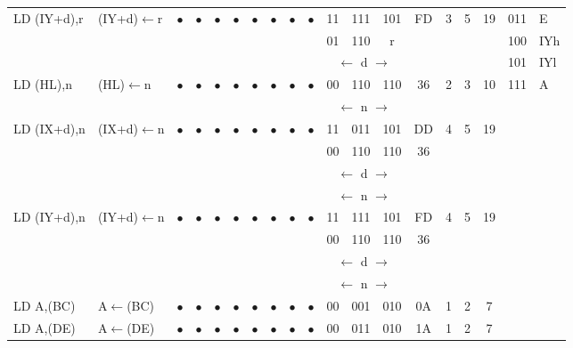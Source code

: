\documentclass[oneside,a4paper]{book}
\begin{document}
{\begin{tabular}{llc@{ }c@{ }c@{ }c@{ }c@{ }c@{ }c@{ }cc@{ }c@{ }cccccll}
LD (IY+d),r & (IY+d)$\leftarrow$r & 
	$\bullet$ & $\bullet$ & $\bullet$ & $\bullet$ & $\bullet$ & $\bullet$ & $\bullet$ & $\bullet$ & 11 & 111 & 101
	& FD & 3 & 5 & 19 & 011 & E \\
\multicolumn{10}{c}{} & 01 & 110 & r & \multicolumn{4}{c}{} & 100 & IYh \\
\multicolumn{10}{c}{} & \multicolumn{3}{c}{$\leftarrow$ d $\rightarrow$} & \multicolumn{4}{c}{} & 101 & IYl \\

LD (HL),n & (HL)$\leftarrow$n & 
	$\bullet$ & $\bullet$ & $\bullet$ & $\bullet$ & $\bullet$ & $\bullet$ & $\bullet$ & $\bullet$ & 00 & 110 & 110
	& 36 & 2 & 3 & 10 & 111 & A \\
\multicolumn{10}{c}{} & \multicolumn{3}{c}{$\leftarrow$ n $\rightarrow$} & \multicolumn{4}{c}{} & & \\

LD (IX+d),n & (IX+d)$\leftarrow$n & 
	$\bullet$ & $\bullet$ & $\bullet$ & $\bullet$ & $\bullet$ & $\bullet$ & $\bullet$ & $\bullet$ & 11 & 011 & 101
	& DD & 4 & 5 & 19 & & \\
\multicolumn{10}{c}{} & 00 & 110 & 110 &  36 & \multicolumn{3}{c}{} & & \\
\multicolumn{10}{c}{} & \multicolumn{3}{c}{$\leftarrow$ d $\rightarrow$} & \multicolumn{4}{c}{} & & \\
\multicolumn{10}{c}{} & \multicolumn{3}{c}{$\leftarrow$ n $\rightarrow$} & \multicolumn{4}{c}{} & & \\

LD (IY+d),n & (IY+d)$\leftarrow$n & 
	$\bullet$ & $\bullet$ & $\bullet$ & $\bullet$ & $\bullet$ & $\bullet$ & $\bullet$ & $\bullet$ & 11 & 111 & 101
	& FD & 4 & 5 & 19 & & \\
\multicolumn{10}{c}{} & 00 & 110 & 110 &  36 & \multicolumn{3}{c}{} & & \\
\multicolumn{10}{c}{} & \multicolumn{3}{c}{$\leftarrow$ d $\rightarrow$} & \multicolumn{4}{c}{} & & \\
\multicolumn{10}{c}{} & \multicolumn{3}{c}{$\leftarrow$ n $\rightarrow$} & \multicolumn{4}{c}{} & & \\

LD A,(BC) & A$\leftarrow$(BC) & 
	$\bullet$ & $\bullet$ & $\bullet$ & $\bullet$ & $\bullet$ & $\bullet$ & $\bullet$ & $\bullet$ & 00 & 001 & 010
	& 0A & 1 & 2 & 7 & & \\

LD A,(DE) & A$\leftarrow$(DE) & 
	$\bullet$ & $\bullet$ & $\bullet$ & $\bullet$ & $\bullet$ & $\bullet$ & $\bullet$ & $\bullet$ & 00 & 011 & 010
	& 1A & 1 & 2 & 7 & & \\


\end{tabular}}
\end{document}

